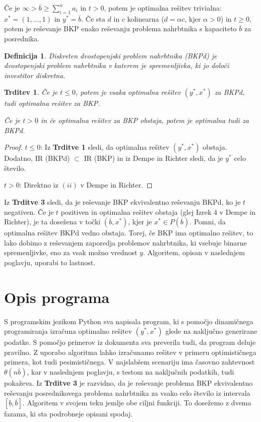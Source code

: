 \documentclass[a4paper, 11pt]{article}
\newtheorem{theorem}{Trditev}
\newtheorem{definition}{Definicija}
\begin{document}
	Če je $\infty > \overline{b} \geq \sum_{i=1}^na_i$ in $t > 0$, potem je optimalna rešitev trivialna: $x^* = (1, \dots, 1)$ in $y^* = \overline{b}$. Če sta $d$ in $c$ kolinearna ($d = \alpha c$, kjer $\alpha > 0$) in $t \geq 0$, potem je reševanje BKP enako reševanju problema nahrbtnika s kapaciteto $\overline{b}$ za posrednika.
	
	\begin{definition}
	Diskreten dvostopenjski problem nahrbtnika (BKPd) je dvostopenjski problem nahrbtnika v katerem je spremenljivka, ki jo določi investitor diskretna.
	\end{definition}

	\begin{theorem}
	Če je $t \leq 0$, potem je vsaka optimalna rešitev $(y^*, x^*)$ za BKPd, tudi optimalna rešitev za BKP.
	
	Če je $t > 0$ in če optimalna rešitev za BKP obstaja, potem je optimalna tudi za BKPd.	
	\end{theorem}
	
	\begin{proof}
	$t \leq 0$: Iz \textbf{Trditve 1} sledi, da optimalna rešitev $(y^*, x^*)$ obstaja. Dodatno, IR (BKPd) $\subset$ IR (BKP) in iz Dempe in Richter sledi, da je $y^*$ celo število.
	
	$t > 0$: Direktno iz $(ii)$ v Dempe in Richter.
	\end{proof}

	Iz \textbf{Trditve 3} sledi, da je reševanje BKP ekvivalentno reševanju BKPd, ko je $t$ negativen. Če je $t$ pozitiven in optimalna rešitev obstaja (glej Izrek 4 v Dempe in Richter), je ta dosežena v točki $(\overline{b}, x^*)$, kjer je $x^* \in P(\overline{b})$. Pomni, da optimalna rešitev BKPd vedno obstaja. Torej, če BKP ima optimalno rešitev, to lako dobimo z reševanjem zaporedja problemov nahrbtnika, ki vsebuje binarne spremenljivke, eno za vsak možno vrednost $y$. Algoritem, opisan v naslednjem poglavju, uporabi to lastnost.
	
	\section{Opis programa}
	
	S programskim jezikom Python sva napisala program, ki s pomočjo dinamičnega programiranja izračuna optimalno rešitev $(y^*, x^*)$ glede na naključno generirane podatke. S pomočjo primerov iz dokumenta sva preverila tudi, da program deluje pravilno. Z uporabo algoritma lahko izračunamo rešitev v primeru optimističnega primera, kot tudi pesimističnega. V najslabšem scenariju ima časovno zahtevnost $\theta(n\overline{b})$, kar v naslednjem poglavju, s testom na naključnih podatkih, tudi pokaževa. Iz \textbf{Trditve 3} je razvidno, da je reševanje problema BKP ekvivalentno reševanju posrednikovega problema nahrbtnika za vsako celo število iz intervala $[ \underline{b}, \overline{b}]$. Algoritem v svojem teku jemlje obe ciljni funkciji. To dosežemo z dvema fazama, ki sta podrobneje opisani spodaj. \\
\end{document}
